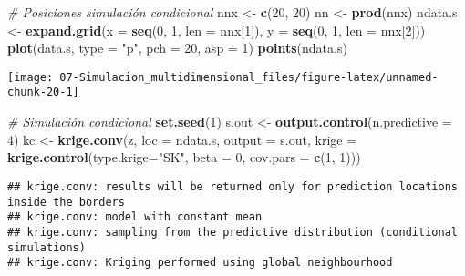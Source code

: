 \documentclass[
]{book}
\newenvironment{Shaded}{\begin{snugshade}}{\end{snugshade}}
\newcommand{\CommentTok}[1]{\textcolor[rgb]{0.56,0.35,0.01}{\textit{#1}}}
\newcommand{\DataTypeTok}[1]{\textcolor[rgb]{0.13,0.29,0.53}{#1}}
\newcommand{\DecValTok}[1]{\textcolor[rgb]{0.00,0.00,0.81}{#1}}
\newcommand{\KeywordTok}[1]{\textcolor[rgb]{0.13,0.29,0.53}{\textbf{#1}}}
\newcommand{\NormalTok}[1]{#1}
\newcommand{\StringTok}[1]{\textcolor[rgb]{0.31,0.60,0.02}{#1}}
\theoremstyle{break}
\theoremstyle{definition}
\theoremstyle{definition}
\theoremstyle{definition}
\theoremstyle{remark}
\begin{document}
\begin{Shaded}
\begin{Highlighting}[]
\CommentTok{# Posiciones simulación condicional}
\NormalTok{nnx <-}\StringTok{ }\KeywordTok{c}\NormalTok{(}\DecValTok{20}\NormalTok{, }\DecValTok{20}\NormalTok{)}
\NormalTok{nn <-}\StringTok{ }\KeywordTok{prod}\NormalTok{(nnx)}
\NormalTok{ndata.s <-}\StringTok{ }\KeywordTok{expand.grid}\NormalTok{(}\DataTypeTok{x =} \KeywordTok{seq}\NormalTok{(}\DecValTok{0}\NormalTok{, }\DecValTok{1}\NormalTok{, }\DataTypeTok{len =}\NormalTok{ nnx[}\DecValTok{1}\NormalTok{]), }\DataTypeTok{y =} \KeywordTok{seq}\NormalTok{(}\DecValTok{0}\NormalTok{, }\DecValTok{1}\NormalTok{, }\DataTypeTok{len =}\NormalTok{ nnx[}\DecValTok{2}\NormalTok{]))}
\KeywordTok{plot}\NormalTok{(data.s, }\DataTypeTok{type =} \StringTok{"p"}\NormalTok{, }\DataTypeTok{pch =} \DecValTok{20}\NormalTok{, }\DataTypeTok{asp =} \DecValTok{1}\NormalTok{)}
\KeywordTok{points}\NormalTok{(ndata.s)}
\end{Highlighting}
\end{Shaded}

\begin{center}\texttt{[image: 07-Simulacion\_multidimensional\_files/figure-latex/unnamed-chunk-20-1]} \end{center}

\begin{Shaded}
\begin{Highlighting}[]
\CommentTok{# Simulación condicional}
\KeywordTok{set.seed}\NormalTok{(}\DecValTok{1}\NormalTok{)}
\NormalTok{s.out <-}\StringTok{ }\KeywordTok{output.control}\NormalTok{(}\DataTypeTok{n.predictive =} \DecValTok{4}\NormalTok{)}
\NormalTok{kc <-}\StringTok{ }\KeywordTok{krige.conv}\NormalTok{(z, }\DataTypeTok{loc =}\NormalTok{ ndata.s, }\DataTypeTok{output =}\NormalTok{ s.out,}
                 \DataTypeTok{krige =} \KeywordTok{krige.control}\NormalTok{(}\DataTypeTok{type.krige=}\StringTok{"SK"}\NormalTok{, }\DataTypeTok{beta =} \DecValTok{0}\NormalTok{, }\DataTypeTok{cov.pars =} \KeywordTok{c}\NormalTok{(}\DecValTok{1}\NormalTok{, }\DecValTok{1}\NormalTok{)))}
\end{Highlighting}
\end{Shaded}

\begin{verbatim}
## krige.conv: results will be returned only for prediction locations inside the borders
## krige.conv: model with constant mean
## krige.conv: sampling from the predictive distribution (conditional simulations)
## krige.conv: Kriging performed using global neighbourhood
\end{verbatim}
\end{document}
